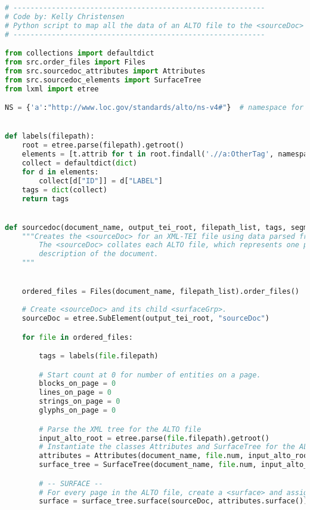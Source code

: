 \documentclass[class=article, crop=false]{standalone}
\begin{document}
\begin{lstlisting}[language=python, style=python]
# -----------------------------------------------------------
# Code by: Kelly Christensen
# Python script to map all the data of an ALTO file to the <sourceDoc> of a TEI file.
# -----------------------------------------------------------

from collections import defaultdict
from src.order_files import Files
from src.sourcedoc_attributes import Attributes
from src.sourcedoc_elements import SurfaceTree
from lxml import etree

NS = {'a':"http://www.loc.gov/standards/alto/ns-v4#"}  # namespace for the Alto xml


def labels(filepath):
    root = etree.parse(filepath).getroot()
    elements = [t.attrib for t in root.findall('.//a:OtherTag', namespaces=NS)]
    collect = defaultdict(dict)
    for d in elements:
        collect[d["ID"]] = d["LABEL"]
    tags = dict(collect)
    return tags


def sourcedoc(document_name, output_tei_root, filepath_list, tags, segmonto_zones, segmonto_lines, config):
    """Creates the <sourceDoc> for an XML-TEI file using data parsed from a series of ALTO files.
        The <sourceDoc> collates each ALTO file, which represents one page of a document, into a wholistic
        description of the document.
    """


    ordered_files = Files(document_name, filepath_list).order_files()
    
    # Create <sourceDoc> and its child <surfaceGrp>.
    sourceDoc = etree.SubElement(output_tei_root, "sourceDoc")

    for file in ordered_files:

        tags = labels(file.filepath)

        # Start count at 0 for number of entities on a page.
        blocks_on_page = 0
        lines_on_page = 0
        strings_on_page = 0
        glyphs_on_page = 0

        # Parse the XML tree for the ALTO file
        input_alto_root = etree.parse(file.filepath).getroot()
        # Instantiate the classes Attributes and SurfaceTree for the ALTO file
        attributes = Attributes(document_name, file.num, input_alto_root, tags, config)
        surface_tree = SurfaceTree(document_name, file.num, input_alto_root)

        # -- SURFACE --
        # For every page in the ALTO file, create a <surface> and assign its attributes.
        surface = surface_tree.surface(sourceDoc, attributes.surface())


\end{lstlisting}
\end{document}
